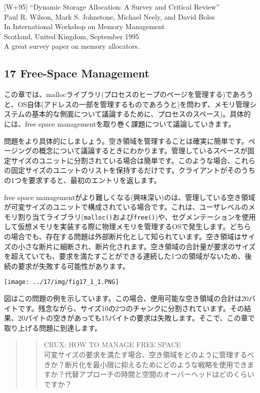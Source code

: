 {[}W+95{]} ``Dynamic Storage Allocation: A Survey and Critical
Review''\\
Paul R. Wilson, Mark S. Johnstone, Michael Neely, and David Boles\\
In International Workshop on Memory Management\\
Scotland, United Kingdom, September 1995\\
A great survey paper on memory allocators.

\newpage

\hypertarget{free-space-management}{%
\subsection*{17 Free-Space Management}\label{free-space-management}}

この章では、mallocライブラリ(プロセスのヒープのページを管理する)であろうと、OS自体(アドレスの一部を管理するものであろうと)を問わず、メモリ管理システムの基本的な側面について議論するために、プロセスのスペース)。具体的には、free
space managementを取り巻く課題について議論していきます。

問題をより具体的にしましょう。空き領域を管理することは確実に簡単です。ページングの概念について議論するときにわかります。管理しているスペースが固定サイズのユニットに分割されている場合は簡単です。このような場合、これらの固定サイズのユニットのリストを保持するだけです。クライアントがそのうちの1つを要求すると、最初のエントリを返します。

free space
managementがより難しくなる(興味深い)のは、管理している空き領域が可変サイズのユニットで構成されている場合です。これは、ユーザレベルのメモリ割り当てライブラリ(\texttt{malloc()}および\texttt{free()})や、セグメンテーションを使用して仮想メモリを実装する際に物理メモリを管理するOSで発生します。どちらの場合でも、存在する問題は外部断片化として知られています。空き領域はサイズの小さな断片に細断され、断片化されます。空き領域の合計量が要求のサイズを超えていても、要求を満たすことができる連続した1つの領域がないため、後続の要求が失敗する可能性があります。

\texttt{[image: ../17/img/fig17\_1\_1.PNG]}

図はこの問題の例を示しています。この場合、使用可能な空き領域の合計は20バイトです。残念ながら、サイズ10の2つのチャンクに分割されています。その結果、20バイトの空きがあっても15バイトの要求は失敗します。そこで、この章で取り上げる問題に到達します。

\begin{quote}
\begin{quote}
CRUX: HOW TO MANAGE FREE SPACE\\
可変サイズの要求を満たす場合、空き領域をどのように管理するべきか？断片化を最小限に抑えるためにどのような戦略を使用できますか？代替アプローチの時間と空間のオーバーヘッドはどのくらいですか？
\end{quote}
\end{quote}

